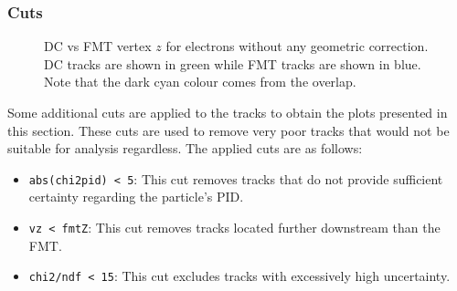 \subsubsection{Cuts}
\label{12.41::cuts}
    \begin{figure}[b!]
        \caption[DC vs FMT $z$ without geometric correction]
        {DC vs FMT vertex $z$ for electrons without any geometric correction.
        DC tracks are shown in green while FMT tracks are shown in blue.
        Note that the dark cyan colour comes from the overlap.}
        \label{fig::12.41::dc_vs_fmt_vz_11983}
    \end{figure}

    Some additional cuts are applied to the tracks to obtain the plots presented in this section.
    These cuts are used to remove very poor tracks that would not be suitable for analysis regardless.
    The applied cuts are as follows:
    \begin{itemize}
        \item
            \texttt{abs(chi2pid) < 5}:
            This cut removes tracks that do not provide sufficient certainty regarding the particle's PID.
        \item
            \texttt{vz < fmtZ}:
            This cut removes tracks located further downstream than the FMT.
        \item
            \texttt{chi2/ndf < 15}:
            This cut excludes tracks with excessively high uncertainty.
    \end{itemize}
